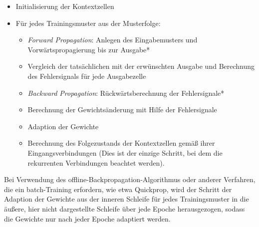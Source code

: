 \begin{itemize}
	\item Initialisierung der Kontextzellen
	\item Für jedes Trainingsmuster aus der Musterfolge:

	\begin{itemize}
		\item \emph{Forward Propagation}: Anlegen des Eingabemusters und Vorwärtspropagierung bis zur Ausgabe*
		\item Vergleich der tatsächlichen mit der erwünschten Ausgabe und Berechnung des Fehlersignals für jede Ausgabezelle
		\item \emph{Backward Propagation}: Rückwärtsberechnung der Fehlersignale*
		\item Berechnung der Gewichtsänderung mit Hilfe der Fehlersignale
		\item Adaption der Gewichte
		\item Berechnung des Folgezustands der Kontextzellen gemäß ihrer Eingangsverbindungen (Dies ist der einzige Schritt, bei dem die rekurrenten Verbindungen beachtet werden).   
	\end{itemize}

\end{itemize}

Bei Verwendung des offline-Backpropagation-Algorithmus oder anderer Verfahren, die ein batch-Training erfordern, wie etwa Quickprop, wird der Schritt der Adaption der Gewichte aus der inneren Schleife für jedes Trainingsmuster in die äußere, hier nicht dargestellte Schleife über jede Epoche herausgezogen, sodass die Gewichte nur nach jeder Epoche adaptiert werden.


